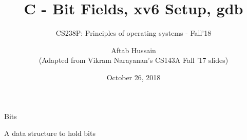 \documentclass[10pt]{beamer}
\title{C - Bit Fields, xv6 Setup, gdb}
\subtitle{CS238P: Principles of operating systems - Fall'18}
\date{October 26, 2018}
\author{Aftab Hussain \\ (Adapted from Vikram Narayanan's CS143A Fall '17 slides)}
\institute{University of California, Irvine}
\begin{document}
\maketitle











\begin{frame}[standout]
  Bits \\
  \end{frame}

  \begin{frame}[standout]
    A data structure to hold bits
    \end{frame}
\end{document}
